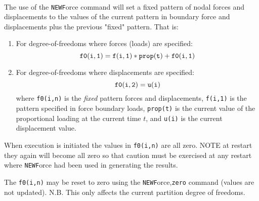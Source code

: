  \\{\smallskip}
\headb

The use of the {\tt NEWF}orce command will set a fixed
pattern of nodal forces and displacements to the values of
the current pattern in boundary force and displacements plus the
previous "fixed" pattern.  That is:

\begin{enumerate}
\item{
For degree-of-freedoms where forces (loads) are  specified:
\begin{equation}
{\tt f0(i,1) = f(i,1)*prop(t) + f0(i,1)}
\end{equation}
}
\item{
For degree-of-freedoms where displacements  are  specified:
\begin{equation}
{\tt f0(i,2) = u(i)}
\end{equation}
where {\tt f0(i,n)} is the {\it fixed} pattern forces and displacements,
{\tt f(i,1)} is the pattern specified in force boundary loads,
{\tt prop(t)} is the current value of the proportional loading at the current
time $t$, and {\tt u(i)} is the current displacement value.
}
\end{enumerate}

When execution is initiated the values in {\tt f0(i,n)} are all
zero.  NOTE at restart they again will become all zero so
that caution must be exercised at any restart where {\tt NEWF}orce
had been used in generating the results.

The {\tt f0(i,n)} may be reset to zero using the {\tt NEWF}orce,{\tt zero}
command (values are not updated).
N.B. This only affects the current partition degree of freedoms.
\vfill\eject
